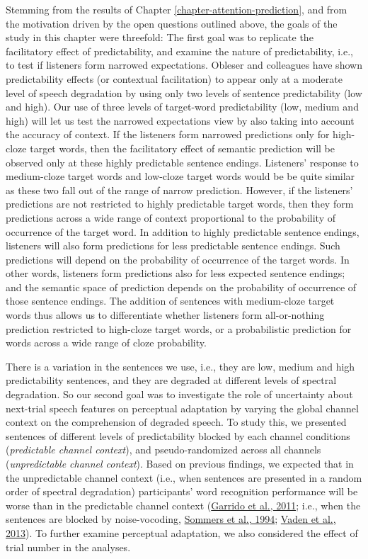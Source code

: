 \documentclass[a4paper, nobind]{templates/ociamthesis}
\begin{document}
\noindent
Stemming from the results of Chapter \ref{chapter-attention-prediction}, and from the motivation driven by the open questions outlined above, the goals of the study in this chapter were threefold:
The first goal was to replicate the facilitatory effect of predictability, and examine the nature of predictability, i.e., to test if listeners form narrowed expectations.
Obleser and colleagues have shown predictability effects (or contextual facilitation) to appear only at a moderate level of speech degradation by using only two levels of sentence predictability (low and high).
Our use of three levels of target-word predictability (low, medium and high) will let us test the narrowed expectations view by also taking into account the accuracy of context.
If the listeners form narrowed predictions only for high-cloze target words, then the facilitatory effect of semantic prediction will be observed only at these highly predictable sentence endings.
Listeners' response to medium-cloze target words and low-cloze target words would be be quite similar as these two fall out of the range of narrow prediction.
However, if the listeners' predictions are not restricted to highly predictable target words, then they form predictions across a wide range of context proportional to the probability of occurrence of the target word.
In addition to highly predictable sentence endings, listeners will also form predictions for less predictable sentence endings.
Such predictions will depend on the probability of occurrence of the target words.
In other words, listeners form predictions also for less expected sentence endings;
and the semantic space of prediction depends on the probability of occurrence of those sentence endings.
The addition of sentences with medium-cloze target words thus allows us to differentiate whether listeners form all-or-nothing prediction restricted to high-cloze target words, or a probabilistic prediction for words across a wide range of cloze probability.

There is a variation in the sentences we use, i.e., they are low, medium and high predictability sentences, and they are degraded at different levels of spectral degradation.
So our second goal was to investigate the role of uncertainty about next-trial speech features on perceptual adaptation by varying the global channel context on the comprehension of degraded speech.
To study this, we presented sentences of different levels of predictability blocked by each channel conditions (\emph{predictable channel context}), and pseudo-randomized across all channels (\emph{unpredictable channel context}).
Based on previous findings, we expected that in the unpredictable channel context (i.e., when sentences are presented in a random order of spectral degradation) participants' word recognition performance will be worse than in the predictable channel context (\protect\hyperlink{ref-Garrido2011}{Garrido et al., 2011}; i.e., when the sentences are blocked by noise-vocoding, \protect\hyperlink{ref-Sommers1994}{Sommers et al., 1994}; \protect\hyperlink{ref-Vaden2013}{Vaden et al., 2013}).
To further examine perceptual adaptation, we also considered the effect of trial number in the analyses.
\end{document}
